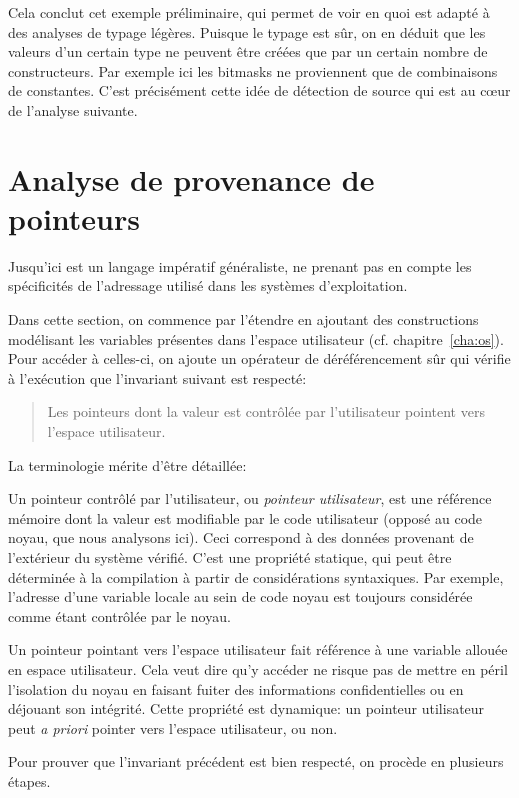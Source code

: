 Cela conclut cet exemple préliminaire, qui permet de voir en quoi \langname est
adapté à des analyses de typage légères. Puisque le typage est sûr, on en déduit
que les valeurs d'un certain type ne peuvent être créées que par un certain
nombre de constructeurs. Par exemple ici les bitmasks ne proviennent que de
combinaisons de constantes. C'est précisément cette idée de détection de source
qui est au cœur de l'analyse suivante.

\section{Analyse de provenance de pointeurs}

Jusqu'ici \langname{} est un langage impératif généraliste, ne prenant pas en
compte les spécificités de l'adressage utilisé dans les systèmes d'exploitation.

Dans cette section, on commence par l'étendre en ajoutant des constructions
modélisant les variables présentes dans l'espace utilisateur (cf.
chapitre~\ref{cha:os}). Pour accéder à celles-ci, on ajoute un opérateur de
déréférencement sûr qui vérifie à l'exécution que l'invariant suivant est
respecté:

\begin{quote}
Les pointeurs dont la valeur est contrôlée par l'utilisateur pointent vers
l'espace utilisateur.
\end{quote}

La terminologie mérite d'être détaillée:

Un pointeur contrôlé par l'utilisateur, ou \emph{pointeur utilisateur}, est une
référence mémoire dont la valeur est modifiable par le code utilisateur (opposé
au code noyau, que nous analysons ici). Ceci correspond à des données provenant
de l'extérieur du système vérifié. C'est une propriété statique, qui peut être
déterminée à la compilation à partir de considérations syntaxiques. Par exemple,
l'adresse d'une variable locale au sein de code noyau est toujours considérée
comme étant contrôlée par le noyau.

Un pointeur pointant vers l'espace utilisateur fait référence à une variable
allouée en espace utilisateur. Cela veut dire qu'y accéder ne risque pas de
mettre en péril l'isolation du noyau en faisant fuiter des informations
confidentielles ou en déjouant son intégrité. Cette propriété est dynamique: un
pointeur utilisateur peut \emph{a priori} pointer vers l'espace utilisateur, ou
non.

Pour prouver que l'invariant précédent est bien respecté, on procède en
plusieurs étapes.

